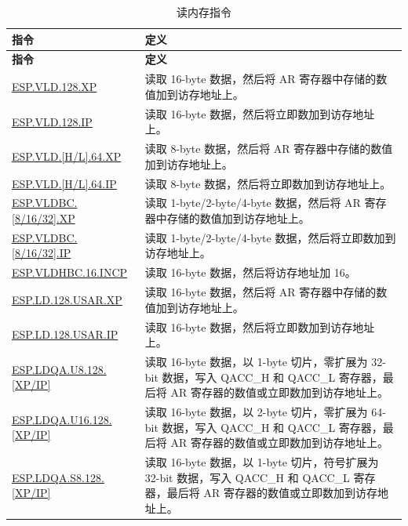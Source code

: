 \begin{longtable}[c]{|l|m{12cm}|}
    \caption{读内存指令}
    \label{tab:pie-load-instructions}\\
    \hline
    \rowcolor{lightgray}
    \textbf{指令} & \textbf{定义} \\\hline
    \endfirsthead
    \rowcolor{lightgray}
    \textbf{指令} & \textbf{定义} \\\hline
    \endhead
    \endfoot

    \hyperref[instruction:ESPVLD128XP]{ESP.VLD.128.XP} & 读取 16-byte 数据，然后将 AR 寄存器中存储的数值加到访存地址上。\\\hline
\hyperref[instruction:ESPVLD128IP]{ESP.VLD.128.IP} & 读取 16-byte 数据，然后将立即数加到访存地址上。\\\hline
\hyperref[instruction:ESPVLDH64XP]{ESP.VLD.[H/L].64.XP} & 读取 8-byte 数据，然后将 AR 寄存器中存储的数值加到访存地址上。\\\hline
\hyperref[instruction:ESPVLDH64IP]{ESP.VLD.[H/L].64.IP} & 读取 8-byte 数据，然后将立即数加到访存地址上。\\\hline
\hyperref[instruction:ESPVLDBC8XP]{ESP.VLDBC.[8/16/32].XP} & 读取 1-byte/2-byte/4-byte 数据，然后将 AR 寄存器中存储的数值加到访存地址上。\\\hline
\hyperref[instruction:ESPVLDBC8IP]{ESP.VLDBC.[8/16/32].IP} & 读取 1-byte/2-byte/4-byte 数据，然后将立即数加到访存地址上。\\\hline
\hyperref[instruction:ESPVLDHBC16INCP]{ESP.VLDHBC.16.INCP} & 读取 16-byte 数据，然后将访存地址加 16。\\\hline
\hyperref[instruction:ESPLD128USARXP]{ESP.LD.128.USAR.XP} & 读取 16-byte 数据，然后将 AR 寄存器中存储的数值加到访存地址上。\\\hline
\hyperref[instruction:ESPLD128USARIP]{ESP.LD.128.USAR.IP} & 读取 16-byte 数据，然后将立即数加到访存地址上。\\\hline
\hyperref[instruction:ESPLDQAU8128XP]{ESP.LDQA.U8.128.[XP/IP]} & 读取 16-byte 数据，以 1-byte 切片，零扩展为 32-bit 数据，写入 QACC\_H 和 QACC\_L 寄存器，最后将 AR 寄存器的数值或立即数加到访存地址上。\\\hline
\hyperref[instruction:ESPLDQAU16128XP]{ESP.LDQA.U16.128.[XP/IP]} & 读取 16-byte 数据，以 2-byte 切片，零扩展为 64-bit 数据，写入 QACC\_H 和 QACC\_L 寄存器，最后将 AR 寄存器的数值或立即数加到访存地址上。\\\hline
\hyperref[instruction:ESPLDQAS8128XP]{ESP.LDQA.S8.128.[XP/IP]} & 读取 16-byte 数据，以 1-byte 切片，符号扩展为 32-bit 数据，写入 QACC\_H 和 QACC\_L 寄存器，最后将 AR 寄存器的数值或立即数加到访存地址上。\\\hline

\end{longtable}
